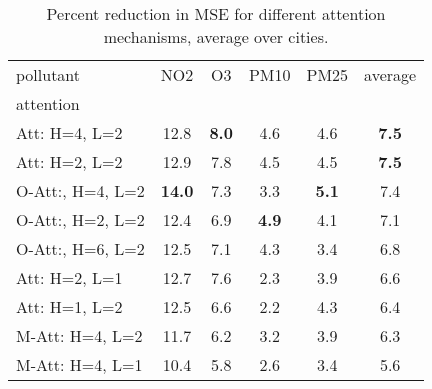 \begin{table}
\begin{center}
\begin{tabular}{lccccc}
\toprule
pollutant & NO2 & O3 & PM10 & PM25 & average \\
attention &  &  &  &  &  \\
\midrule
Att: H=4, L=2 & 12.8 & \textbf{8.0} & 4.6 & 4.6 & \textbf{7.5} \\
Att: H=2, L=2 & 12.9 & 7.8 & 4.5 & 4.5 & \textbf{7.5} \\
O-Att:, H=4, L=2 & \textbf{14.0} & 7.3 & 3.3 & \textbf{5.1} & 7.4 \\
O-Att:, H=2, L=2 & 12.4 & 6.9 & \textbf{4.9} & 4.1 & 7.1 \\
O-Att:, H=6, L=2 & 12.5 & 7.1 & 4.3 & 3.4 & 6.8 \\
Att: H=2, L=1 & 12.7 & 7.6 & 2.3 & 3.9 & 6.6 \\
Att: H=1, L=2 & 12.5 & 6.6 & 2.2 & 4.3 & 6.4 \\
M-Att: H=4, L=2 & 11.7 & 6.2 & 3.2 & 3.9 & 6.3 \\
M-Att: H=4, L=1 & 10.4 & 5.8 & 2.6 & 3.4 & 5.6 \\
\bottomrule
\end{tabular}
\end{center}
\caption{Percent reduction in MSE for different attention mechanisms, average over cities.}
\label{tab:MSEGainAverage}
\end{table}
